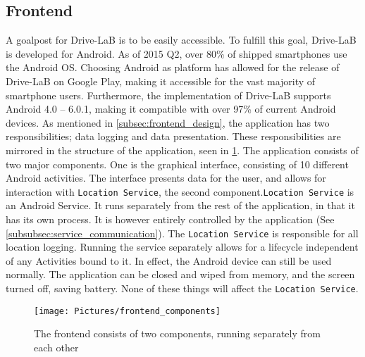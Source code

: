 \subsection{Frontend}\label{subsec:frontend_implementation}
A goalpost for Drive-LaB is to be easily accessible. To fulfill this goal, Drive-LaB is developed for Android. As of 2015 Q2, over 80\% of shipped smartphones use the Android OS\citep{smartphone_market_share}. Choosing Android as platform has allowed for the release of Drive-LaB on Google Play\citep{google_play_drivelab}, making it accessible for the vast majority of smartphone users. Furthermore, the implementation of Drive-LaB supports Android 4.0 – 6.0.1, making it compatible with over 97\% of current Android devices\citep{android_version_distribution}.
As mentioned in \ref{subsec:frontend_design}, the application has two responsibilities; data logging and data presentation. These responsibilities are mirrored in the structure of the application, seen in \ref{fig:frontend_components}. The application consists of two major components. One is the graphical interface, consisting of 10 different Android activities\citep{android_activity}. The interface presents data for the user, and allows for interaction with \texttt{Location Service}, the second component.\texttt{Location Service} is an Android Service\citep{android_service}. It runs separately from the rest of the application, in that it has its own process. It is however entirely controlled by the application (See \ref{subsubsec:service_communication}). The \texttt{Location Service} is responsible for all location logging. Running the service separately allows for a lifecycle independent of any Activities bound to it. In effect, the Android device can still be used normally. The application can be closed and wiped from memory, and the screen turned off, saving battery. None of these things will affect the \texttt{Location Service}.

\begin{figure}[tb]
\centering
\texttt{[image: Pictures/frontend\_components]}
\caption{The frontend consists of two components, running separately from each other}
\label{fig:frontend_components}
\end{figure}

